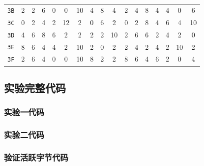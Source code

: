 \begin{center}
\begin{small}
\begin{longtable}{c|cccccccccccccccc}
\texttt{3B} & 2 & 2 & 6 & 0 & 0 & 10 & 4 & 8 & 4 & 2 & 4 & 8 & 4 & 4 & 0 & 6 \\
\texttt{3C} & 0 & 2 & 4 & 2 & 12 & 2 & 0 & 6 & 2 & 0 & 2 & 8 & 4 & 6 & 4 & 10 \\
\texttt{3D} & 4 & 6 & 8 & 6 & 2 & 2 & 2 & 2 & 10 & 2 & 6 & 6 & 2 & 4 & 2 & 0 \\
\texttt{3E} & 8 & 6 & 4 & 4 & 2 & 10 & 2 & 0 & 2 & 2 & 4 & 2 & 4 & 2 & 10 & 2 \\
\texttt{3F} & 2 & 6 & 4 & 0 & 0 & 10 & 8 & 2 & 2 & 8 & 6 & 4 & 6 & 2 & 0 & 4 \\ \bottomrule
\end{longtable}
\end{small}
\end{center}

\subsection{实验完整代码}

\subsubsection{实验一代码}

\subsubsection{实验二代码}

\subsubsection{验证活跃字节代码}
